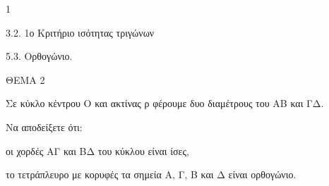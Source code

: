 \begin{ylh}{1}
    \item 3.2. 1ο Κριτήριο ισότητας τριγώνων
    \item 5.3. Ορθογώνιο.
\end{ylh}

ΘΕΜΑ 2

Σε κύκλο κέντρου Ο και ακτίνας ρ φέρουμε δυο διαμέτρους του ΑΒ και ΓΔ.

Να αποδείξετε ότι:

\begin{alist}
\item οι χορδές ΑΓ και ΒΔ του κύκλου είναι ίσες, 

\item το τετράπλευρο με κορυφές τα σημεία Α, Γ, Β και Δ είναι ορθογώνιο. 
\end{alist}
